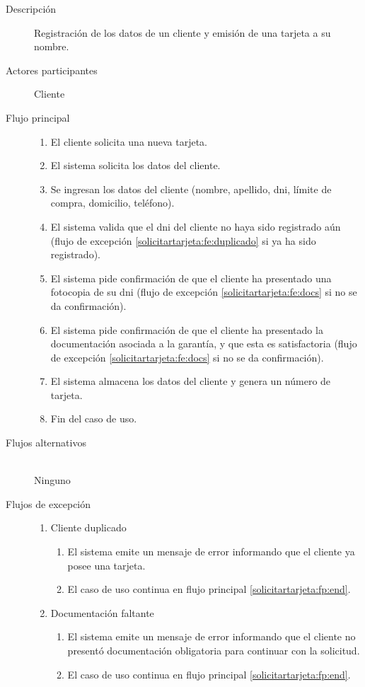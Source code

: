 \begin{description}

\item[Descripción] 
Registración de los datos de un cliente y emisión de una tarjeta a su nombre.

\item[Actores participantes] 
Cliente

\item[Flujo principal] \hfill
\begin{enumerate}
\item El cliente solicita una nueva tarjeta.
\item El sistema solicita los datos del cliente.
\item Se ingresan los datos del cliente (nombre, apellido, dni, límite de
compra, domicilio, teléfono).
\item El sistema valida que el dni del cliente no haya sido registrado aún
(flujo de excepción \ref{solicitartarjeta:fe:duplicado} si ya ha sido
registrado).
\item El sistema pide confirmación de que el cliente ha presentado una fotocopia
de su dni (flujo de excepción \ref{solicitartarjeta:fe:docs} si no se da
confirmación).
\item El sistema pide confirmación de que el cliente ha presentado la
documentación asociada a la garantía, y que esta es satisfactoria (flujo de
excepción \ref{solicitartarjeta:fe:docs} si no se da confirmación).
\item El sistema almacena los datos del cliente y genera un número de tarjeta.
\item Fin del caso de uso. \label{solicitartarjeta:fp:end}
\end{enumerate}

\item[Flujos alternativos] \hfill \\
Ninguno

\item[Flujos de excepción] \hfill
\begin{enumerate}

\item Cliente duplicado \label{solicitartarjeta:fe:duplicado}
\begin{enumerate}
\item El sistema emite un mensaje de error informando que el cliente ya posee
una tarjeta.
\item El caso de uso continua en flujo principal \ref{solicitartarjeta:fp:end}.
\end{enumerate}

\item Documentación faltante \label{solicitartarjeta:fe:docs}
\begin{enumerate}
\item El sistema emite un mensaje de error informando que el cliente no presentó
documentación obligatoria para continuar con la solicitud.
\item El caso de uso continua en flujo principal \ref{solicitartarjeta:fp:end}.
\end{enumerate}
\end{enumerate}

\end{description}

